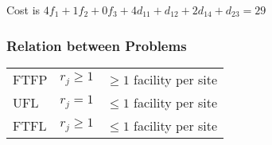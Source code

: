 \documentclass[hyperref,dvipsnames,svgnames]{beamer}
\begin{document}
\begin{frame}
\begin{figure}
{
  }
  \end{figure}

  Cost is $4f_1 + 1f_2 + 0f_3 + 4d_{11} + d_{12} + 2d_{14} +
  d_{23} = 29$
\end{frame}

\begin{frame}
  \frametitle{Relation between Problems}
  \begin{center}
  \begin{tabular}{l  l  l}
    \rowcolor{light-gray}
    FTFP & $r_j \geq 1$ & $\geq 1$ facility per site\\
    \rowcolor{light-gray}
    UFL  & $r_j = 1$ & $\leq 1$ facility per site\\
    \rowcolor{light-gray}
    FTFL & $r_j \geq 1$ & $\leq 1$ facility per site\\
  \end{tabular}
  \end{center}


\end{frame}
\end{document}
